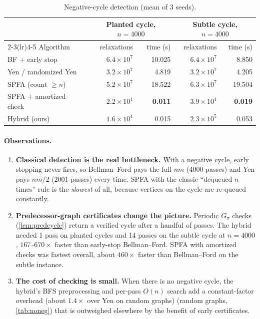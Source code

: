 \documentclass[11pt,a4paper]{article}
\theoremstyle{definition}
\begin{document}
\begin{table}[H]
\centering\small
\begin{tabular}{@{}lrrrr@{}}
\toprule
& \multicolumn{2}{c}{Planted cycle, $n=4000$} & \multicolumn{2}{c}{Subtle cycle, $n=4000$}\\
\cmidrule(lr){2-3}\cmidrule(lr){4-5}
Algorithm & relaxations & time (s) & relaxations & time (s)\\
\midrule
BF + early stop & $6.4\times10^7$ & 10.025 & $6.4\times10^7$ & 8.850\\
Yen / randomized Yen & $3.2\times10^7$ & 4.819 & $3.2\times10^7$ & 4.205\\
SPFA (count $\ge n$) & $5.2\times10^7$ & 18.522 & $6.3\times10^7$ & 19.504\\
SPFA + amortized check & $2.2\times10^4$ & \textbf{0.011} & $3.9\times10^4$ & \textbf{0.019}\\
Hybrid (ours) & $1.6\times10^4$ & 0.015 & $2.3\times10^5$ & 0.053\\
\bottomrule
\end{tabular}
\caption{Negative-cycle detection (mean of 3 seeds).}
\label{tab:neg}
\end{table}

\paragraph{Observations.}
\begin{enumerate}
\item \textbf{Classical detection is the real bottleneck.} With a negative cycle, early stopping never fires, so Bellman--Ford pays the full $nm$ (4000 passes) and Yen pays $nm/2$ (2001 passes) every time. SPFA with the classic ``dequeued $n$ times'' rule is the \emph{slowest} of all, because vertices on the cycle are re-queued constantly.
\item \textbf{Predecessor-graph certificates change the picture.} Periodic $G_\pi$ checks (\cref{lem:predcycle}) return a verified cycle after a handful of passes. The hybrid needed 1 pass on planted cycles and 14 passes on the subtle cycle at $n=4000$, $167$--$670\times$ faster than early-stop Bellman--Ford. SPFA with amortized checks was fastest overall, about $460\times$ faster than Bellman--Ford on the subtle instance.
\item \textbf{The cost of checking is small.} When there is no negative cycle, the hybrid's BFS preprocessing and per-pass $O(n)$ search add a constant-factor overhead (about $1.4\times$ over Yen on random graphs) (random graphs, \cref{tab:noneg}) that is outweighed elsewhere by the benefit of early certificates.
\end{enumerate}
\end{document}
